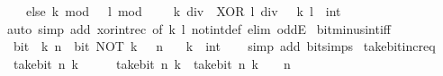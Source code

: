\begin{isabellebody}
\ \ \ \ else\ {\isasymbar}k\ mod\ {}\ {\isacharminus}{\kern0pt}\ l\ mod\ {}{\isasymbar}\ {\isacharplus}{\kern0pt}\ {}\ {\isacharasterisk}{\kern0pt}\ {\isacharparenleft}{\kern0pt}{\isacharparenleft}{\kern0pt}k\ div\ {}{\isacharparenright}{\kern0pt}\ XOR\ {\isacharparenleft}{\kern0pt}l\ div\ {}{\isacharparenright}{\kern0pt}{\isacharparenright}{\kern0pt}{\isacharparenright}{\kern0pt}{\isacartoucheclose}\ \ k\ l\ {\isacharcolon}{\kern0pt}{\isacharcolon}{\kern0pt}\ int\isanewline
%
\isadelimproof
\ \ %
\endisadelimproof
%
\isatagproof
{}\isamarkupfalse%
\ {\isacharparenleft}{\kern0pt}auto\ simp\ add{\isacharcolon}{\kern0pt}\ xor{\isacharunderscore}{\kern0pt}int{\isacharunderscore}{\kern0pt}rec\ {\isacharbrackleft}{\kern0pt}of\ k\ l{\isacharbrackright}{\kern0pt}\ not{\isacharunderscore}{\kern0pt}int{\isacharunderscore}{\kern0pt}def\ elim{\isacharbang}{\kern0pt}{\isacharcolon}{\kern0pt}\ oddE{\isacharparenright}{\kern0pt}%
\endisatagproof
{\isafoldproof}%
%
\isadelimproof
\isanewline
%
\endisadelimproof
\isanewline
{}\isamarkupfalse%
\ bit{\isacharunderscore}{\kern0pt}minus{\isacharunderscore}{\kern0pt}int{\isacharunderscore}{\kern0pt}iff{\isacharcolon}{\kern0pt}\isanewline
\ \ {\isacartoucheopen}bit\ {\isacharparenleft}{\kern0pt}{\isacharminus}{\kern0pt}\ k{\isacharparenright}{\kern0pt}\ n\ {\isasymlongleftrightarrow}\ bit\ {\isacharparenleft}{\kern0pt}NOT\ {\isacharparenleft}{\kern0pt}k\ {\isacharminus}{\kern0pt}\ {}{\isacharparenright}{\kern0pt}{\isacharparenright}{\kern0pt}\ n{\isacartoucheclose}\isanewline
\ \ \ k\ {\isacharcolon}{\kern0pt}{\isacharcolon}{\kern0pt}\ int\isanewline
%
\isadelimproof
\ \ %
\endisadelimproof
%
\isatagproof
{}\isamarkupfalse%
\ {\isacharparenleft}{\kern0pt}simp\ add{\isacharcolon}{\kern0pt}\ bit{\isacharunderscore}{\kern0pt}simps{\isacharparenright}{\kern0pt}%
\endisatagproof
{\isafoldproof}%
%
\isadelimproof
\isanewline
%
\endisadelimproof
\isanewline
{}\isamarkupfalse%
\ take{\isacharunderscore}{\kern0pt}bit{\isacharunderscore}{\kern0pt}incr{\isacharunderscore}{\kern0pt}eq{\isacharcolon}{\kern0pt}\isanewline
\ \ {\isacartoucheopen}take{\isacharunderscore}{\kern0pt}bit\ n\ {\isacharparenleft}{\kern0pt}k\ {\isacharplus}{\kern0pt}\ {}{\isacharparenright}{\kern0pt}\ {\isacharequal}{\kern0pt}\ {}\ {\isacharplus}{\kern0pt}\ take{\isacharunderscore}{\kern0pt}bit\ n\ k{\isacartoucheclose}\ \ {\isacartoucheopen}take{\isacharunderscore}{\kern0pt}bit\ n\ k\ {\isasymnoteq}\ {}\ {\isacharcircum}{\kern0pt}\ n\ {\isacharminus}{\kern0pt}\ {}{\isacartoucheclose}\isanewline

\end{isabellebody}

